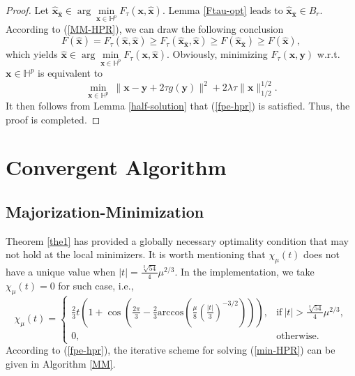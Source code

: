 \documentclass{article}
\numberwithin{equation}{section}
\begin{document}
\begin{proof}
Let $\hat{\mathbf{x}}_{\hat{\mathbf{x}}}\in\arg\min\limits_{\mathbf{x}\in\mathbb{H}^p}F_\tau(\mathbf{x},\hat{\mathbf{x}})$. Lemma \ref{Ftau-opt} leads to $\hat{\mathbf{x}}_{\hat{\mathbf{x}}}\in B_r$.  According to (\ref{MM-HPR}), we can draw the following conclusion
\begin{equation}
F(\hat{\mathbf{x}})=F_{\tau}(\hat{\mathbf{x}},\hat{\mathbf{x}})\geq F_{\tau}(\hat{\mathbf{x}}_{\hat{\mathbf{x}}},\hat{\mathbf{x}})
\geq F(\hat{\mathbf{x}}_{\hat{\mathbf{x}}})\geq F(\hat{\mathbf{x}}),\nonumber
\end{equation}
which yields $\hat{\mathbf{x}}\in\arg\min\limits_{\mathbf{x}\in\mathbb{H}^p}F_{\tau}(\mathbf{x},\hat{\mathbf{x}})$. Obviously, minimizing  $F_{\tau}(\mathbf{x},\mathbf{y})$ w.r.t. $\mathbf{x}\in\mathbb{H}^p$ is equivalent to
\begin{equation}
\min\limits_{\mathbf{x}\in\mathbb{H}^p}~\|\mathbf{x}-\mathbf{y}+2\tau g(\mathbf{y})\|^2
+2\lambda\tau\|\mathbf{x}\|_{1/2}^{1/2}.\nonumber
\end{equation} 
It then follows from Lemma \ref{half-solution} that (\ref{fpe-hpr}) is satisfied. Thus, the proof is completed.
\end{proof}





\section{Convergent Algorithm}\label{convergence}
\subsection{Majorization-Minimization}\label{s5.1}

Theorem \ref{the1} has provided a globally necessary optimality condition that may not hold at the local minimizers. It is worth mentioning that $\chi_{\mu}(t)$ does not have a unique value when $|t|=\frac{\sqrt[3]{54}}{4}\mu^{2/3}$. In the implementation, we take $\chi_{\mu}(t)=0$ for such case, i.e., %
\begin{equation}
\chi_{\mu}(t)=
\begin{cases}
{\frac{2}{3}t(1+\cos(\frac{2\pi}{3}-\frac{2}{3}\mathrm{arccos}(\frac{\mu}{8}(\frac{|t|}{3})^{-3/2}))),}&{\mbox{if}~|t|>\frac{\sqrt[3]{54}}{4}\mu^{2/3}},\nonumber\\
{0,}&\textrm{otherwise.}\nonumber
\end{cases}
\end{equation}
According to (\ref{fpe-hpr}), the iterative scheme for solving (\ref{min-HPR}) can be given in Algorithm \ref{MM}.
\end{document}

